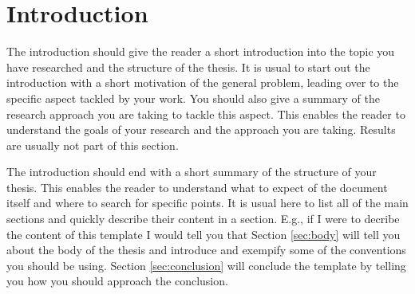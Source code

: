 
\section{Introduction} \label{sec:introduction}

The introduction should give the reader a short introduction into the topic you have researched and the structure of the thesis. It is usual to start out the introduction with a short motivation of the general problem, leading over to the specific aspect tackled by your work. You should also give a summary of the research approach you are taking to tackle this aspect. This enables the reader to understand the goals of your research and the approach you are taking. Results are usually not part of this section.

The introduction should end with a short summary of the structure of your thesis. This enables the reader to understand what to expect of the document itself and where to search for specific points. It is usual here to list all of the main sections and quickly describe their content in a section. E.g., if I were to decribe the content of this template I would tell you that Section \ref{sec:body} will tell you about the body of the thesis and introduce and exempify some of the conventions you should be using. Section \ref{sec:conclusion} will conclude the template by telling you how you should approach the conclusion.

